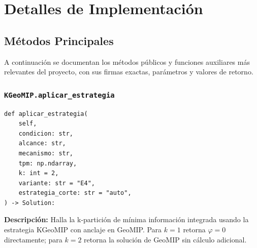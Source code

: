 
\section{Detalles de Implementación}

\subsection{Métodos Principales}

A continuación se documentan los métodos públicos y funciones auxiliares más
relevantes del proyecto, con sus firmas exactas, parámetros y valores de retorno.

\subsubsection*{\texttt{KGeoMIP.aplicar\_estrategia}}

\begin{lstlisting}
def aplicar_estrategia(
    self,
    condicion: str,
    alcance: str,
    mecanismo: str,
    tpm: np.ndarray,
    k: int = 2,
    variante: str = "E4",
    estrategia_corte: str = "auto",
) -> Solution:
\end{lstlisting}

\textbf{Descripción:} Halla la k-partición de mínima información integrada
usando la estrategia KGeoMIP con anclaje en GeoMIP. Para $k=1$ retorna
$\varphi=0$ directamente; para $k=2$ retorna la solución de GeoMIP sin cálculo
adicional.

